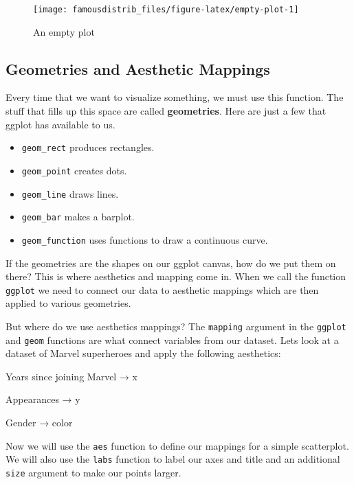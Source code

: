 \documentclass[
]{article}
\providecommand{\tightlist}{%
  \setlength{\itemsep}{0pt}\setlength{\parskip}{0pt}}
\begin{document}
\begin{figure}

{\centering \texttt{[image: famousdistrib\_files/figure-latex/empty-plot-1]} 

}

\caption{An empty plot}\label{fig:empty-plot}
\end{figure}

\hypertarget{geometries-and-aesthetic-mappings}{%
\subsection{Geometries and Aesthetic Mappings}\label{geometries-and-aesthetic-mappings}}

Every time that we want to visualize something, we must use this function. The stuff that fills up this space are called \textbf{geometries}. Here are just a few that ggplot has available to us.

\begin{itemize}
\tightlist
\item
  \texttt{geom\_rect} produces rectangles.
\item
  \texttt{geom\_point} creates dots.
\item
  \texttt{geom\_line} draws lines.
\item
  \texttt{geom\_bar} makes a barplot.
\item
  \texttt{geom\_function} uses functions to draw a continuous curve.
\end{itemize}

If the geometries are the shapes on our ggplot canvas, how do we put them on there? This is where aesthetics and mapping come in. When we call the function \texttt{ggplot} we need to connect our data to aesthetic mappings which are then applied to various geometries.

But where do we use aesthetics mappings? The \texttt{mapping} argument in the \texttt{ggplot} and \texttt{geom} functions are what connect variables from our dataset. Lets look at a dataset of Marvel superheroes and apply the following aesthetics:

Years since joining Marvel → x

Appearances → y

Gender → color

Now we will use the \texttt{aes} function to define our mappings for a simple scatterplot. We will also use the \texttt{labs} function to label our axes and title and an additional \texttt{size} argument to make our points larger.
\end{document}
